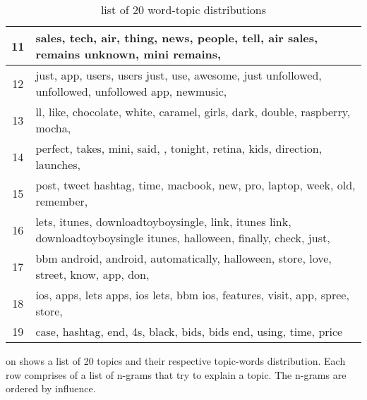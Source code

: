 \begin{table}
\begin{tabular}{c p{16cm}}
    11    & sales, tech, air, thing, news, people, tell, air sales, remains unknown, mini remains, \\ \midrule
    12    & just, app, users, users just, use, awesome, just unfollowed, unfollowed, unfollowed app, newmusic, \\ \midrule
    13    & ll, like, chocolate, white, caramel, girls, dark, double, raspberry, mocha, \\ \midrule
    14    & perfect, takes, mini, said, , tonight, retina, kids, direction, launches, \\ \midrule
    15    & post, tweet hashtag, time, macbook, new, pro, laptop, week, old, remember, \\ \midrule
    16    & lets, itunes, downloadtoyboysingle, link, itunes link, downloadtoyboysingle itunes, halloween, finally, check, just, \\ \midrule
    17    & bbm android, android, automatically, halloween, store, love, street, know, app, don, \\ \midrule
    18    & ios, apps, lets apps, ios lets, bbm ios, features, visit, app, spree, store, \\ \midrule
    19    & case, hashtag, end, 4s, black, bids, bids end, using, time, price \\ \midrule
  \end{tabular}
  \caption{list of 20 word-topic distributions}
  \label{tab:20_topics}
\end{table}

 on  shows a list of 20 topics and their respective topic-words distribution.
Each row comprises of a list of n-grams that try to explain a topic. The n-grams are ordered by
influence.

